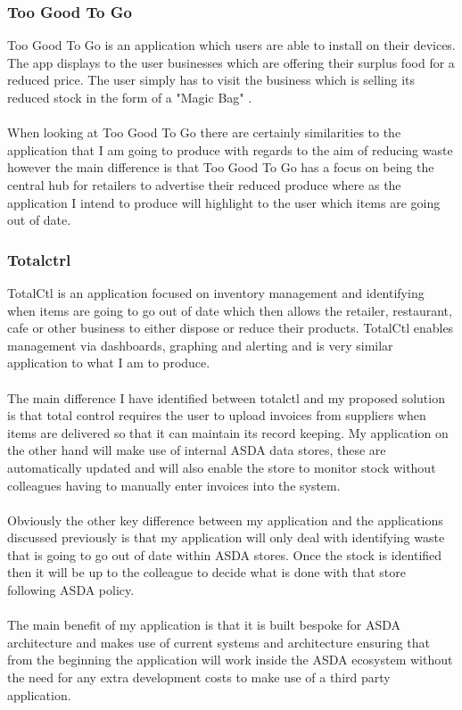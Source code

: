 \documentclass[a4paper,11pt]{report}
\begin{document}
\subsubsection{Too Good To Go}
Too Good To Go is an application which users are able to install on their devices.
The app displays to the user businesses which are offering their surplus food for a reduced price.
The user simply has to visit the business which is selling its reduced stock in the form of a "Magic Bag" \cite{too-good-to-go}.
\\
\\
When looking at Too Good To Go there are certainly similarities to the application that I am going to 
produce with regards to the aim of reducing waste however the main difference is that Too Good To Go 
has a focus on being the central hub for retailers to advertise their reduced produce where as the application
 I intend to produce will highlight to the user which items are going out of date. 

\subsubsection {Totalctrl}
TotalCtl is an application focused on inventory management and identifying when items are going to go out of
date which then allows the retailer, restaurant, cafe or other business to either dispose or reduce their products.
TotalCtl enables management via dashboards, graphing and alerting and is very similar application to what I am to produce\cite{totalctrl}.
\\
\\
The main difference I have identified between totalctl and my proposed solution
is that total control requires the user to upload invoices from suppliers when
items are delivered so that it can maintain its record keeping. My application 
on the other hand will make use of internal ASDA data stores, these are automatically
updated and will also enable the store to monitor stock without colleagues having to
manually enter invoices into the system.
\\
\\
Obviously the other key difference between my application and the applications discussed previously
is that my application will only deal with identifying waste that is going to go out of date within ASDA stores.
Once the stock is identified then it will be up to the colleague to decide what is done with that store following ASDA policy.
\\
\\
The main benefit of my application is that it is built bespoke for ASDA architecture and makes
use of current systems and architecture ensuring that from the beginning the application will 
work inside the ASDA ecosystem without the need for any extra development costs to make use of
a third party application. 
\end{document}

